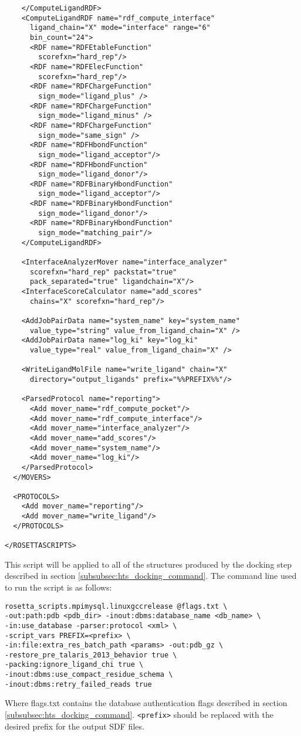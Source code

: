 \begin{verbatim}
    </ComputeLigandRDF>
    <ComputeLigandRDF name="rdf_compute_interface"
      ligand_chain="X" mode="interface" range="6" 
      bin_count="24">
      <RDF name="RDFEtableFunction"
        scorefxn="hard_rep"/>
      <RDF name="RDFElecFunction"
        scorefxn="hard_rep"/>
      <RDF name="RDFChargeFunction"
        sign_mode="ligand_plus" />
      <RDF name="RDFChargeFunction"
        sign_mode="ligand_minus" />
      <RDF name="RDFChargeFunction"
        sign_mode="same_sign" />
      <RDF name="RDFHbondFunction"
        sign_mode="ligand_acceptor"/>
      <RDF name="RDFHbondFunction"
        sign_mode="ligand_donor"/> 
      <RDF name="RDFBinaryHbondFunction"
        sign_mode="ligand_acceptor"/>
      <RDF name="RDFBinaryHbondFunction"
        sign_mode="ligand_donor"/>
      <RDF name="RDFBinaryHbondFunction"
        sign_mode="matching_pair"/>  
    </ComputeLigandRDF>

    <InterfaceAnalyzerMover name="interface_analyzer"
      scorefxn="hard_rep" packstat="true"
      pack_separated="true" ligandchain="X"/>
    <InterfaceScoreCalculator name="add_scores" 
      chains="X" scorefxn="hard_rep"/>
    
    <AddJobPairData name="system_name" key="system_name"
      value_type="string" value_from_ligand_chain="X" />
    <AddJobPairData name="log_ki" key="log_ki"
      value_type="real" value_from_ligand_chain="X" />
    
    <WriteLigandMolFile name="write_ligand" chain="X"
      directory="output_ligands" prefix="%%PREFIX%%"/>

    <ParsedProtocol name="reporting">
      <Add mover_name="rdf_compute_pocket"/>
      <Add mover_name="rdf_compute_interface"/>
      <Add mover_name="interface_analyzer"/>
      <Add mover_name="add_scores"/>
      <Add mover_name="system_name"/>
      <Add mover_name="log_ki"/>
    </ParsedProtocol>
  </MOVERS>
  
  <PROTOCOLS>
    <Add mover_name="reporting"/>
    <Add mover_name="write_ligand"/>
  </PROTOCOLS>
  
</ROSETTASCRIPTS>
\end{verbatim}
\doublespace
This script will be applied to all of the structures produced by the docking step described in section \ref{subsubsec:hts_docking_command}.
The command line used to run the script is as follows:
\singlespace
\begin{verbatim}
rosetta_scripts.mpimysql.linuxgccrelease @flags.txt \
-out:path:pdb <pdb_dir> -inout:dbms:database_name <db_name> \
-in:use_database -parser:protocol <xml> \
-script_vars PREFIX=<prefix> \
-in:file:extra_res_batch_path <params> -out:pdb_gz \
-restore_pre_talaris_2013_behavior true \
-packing:ignore_ligand_chi true \
-inout:dbms:use_compact_residue_schema \
-inout:dbms:retry_failed_reads true
\end{verbatim}
\doublespace
Where flags.txt contains the database authentication flags described in section \ref{subsubsec:hts_docking_command}.
\texttt{<prefix>} should be replaced with the desired prefix for the output SDF files.  

